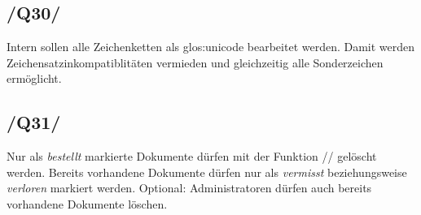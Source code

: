 \subsection{/Q30/} Intern sollen alle Zeichenketten als \Gls{glos:unicode} bearbeitet werden. Damit werden Zeichensatzinkompatiblitäten vermieden und gleichzeitig alle Sonderzeichen ermöglicht.
\subsection{/Q31/} Nur als \emph{bestellt} markierte Dokumente dürfen mit der Funktion // gelöscht werden. Bereits vorhandene Dokumente dürfen nur als \emph{vermisst} beziehungsweise \emph{verloren} markiert werden. Optional: Administratoren dürfen auch bereits vorhandene Dokumente löschen.